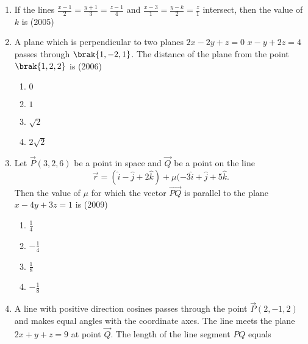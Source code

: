 \begin{enumerate}[label=\thesubsection.\arabic*.,ref=\thesubsection.\theenumi]
\begin{enumerate}
\end{enumerate}
\item If the lines $\frac{x-1}{2}=\frac{y+1}{3}=\frac{z-1}{4}$ and $\frac{x-3}{1}=\frac{y-k}{2}=\frac{z}{1}$ intersect, then the value of $k$ is 
\hfill (2005)
\begin{enumerate}
\end{enumerate}
    \item A plane which is perpendicular to two planes $2x-2y+z=0$  $x-y+2z=4$ passes through $\brak{1,-2,1}$. The distance of the plane from the point $\brak{1,2,2}$ is
    \hfill{(2006)}
    \begin{multicols}{4} 
    	\begin{enumerate}
    		\item $0$
    		\item $1$
    		\item $\sqrt{2}$
    		\item $2\sqrt{2}$
    	\end{enumerate}
    \end{multicols}
    \item Let $\vec{P}(3,2,6)$ be a point in space and $\vec{Q}$ be a point on the line 
    $$\vec{r} = (\hat{i} - \hat{j} + 2\hat{k}) + \mu(-3\hat{i} +\hat{j}+5\hat{k}.$$
    Then the value of $\mu$ for which the vector $\overrightarrow{PQ}$ is parallel to the plane $x-4y+3z=1$ is
    \hfill{(2009)}
    \begin{multicols}{4}
    	\begin{enumerate}
    		\item $\frac{1}{4}$
    		\item $-\frac{1}{4}$
    		\item $\frac{1}{8}$
    		\item $-\frac{1}{8}$
    	\end{enumerate}
    \end{multicols}
    \item A line with positive direction cosines passes through the point $\vec{P}(2,-1,2)$ and makes equal angles with the coordinate axes. The line meets the plane $2x+y+z=9$ at point $\vec{Q}$. The length of the line segment $PQ$ equals 

\end{enumerate}
